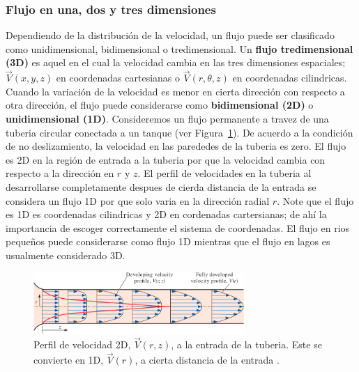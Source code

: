 \documentclass[10pt, oneside]{article}
\begin{document}
\subsubsection{Flujo en una, dos y tres dimensiones}
Dependiendo de la distribuci\'on de la velocidad, un flujo puede ser clasificado como unidimensional, bidimensional o tredimensional. Un \textbf{flujo tredimensional (3D)} es aquel en el cual la velocidad cambia en las tres dimensiones espaciales; $\vec{V}(x,y,z)$ en coordenadas cartesianas o $\vec{V}(r,\theta,z)$ en coordenadas cilindricas. Cuando la variaci\'on de la velocidad es menor en cierta direcci\'on con respecto a otra direcci\'on, el flujo puede considerarse como \textbf{bidimensional (2D)} o \textbf{unidimensional (1D)}.
Consideremos un flujo permanente a travez de una tuberia circular conectada a un tanque (ver Figura~\ref{flowd}). De acuerdo a la condici\'on de no deslizamiento, la velocidad en las parededes de la tuberia es zero. El flujo es 2D en la regi\'on de entrada a la tuberia por que la velocidad cambia con respecto a la direcci\'on en $r$ y $z$. El perfil de velocidades en la tuberia al desarrollarse completamente despues de cierda distancia de la entrada se considera un flujo 1D por que solo varia en la direcci\'on radial $r$. Note que el flujo es 1D es coordenadas cilindricas y 2D en cordenadas cartersianas; de ah\'i la importancia de escoger correctamente el sistema de coordenadas. El flujo en rios peque\~nos puede considerarse como flujo 1D mientras que el flujo en lagos es usualmente considerado 3D.

\begin{figure}[h]
\centering
\includegraphics[width=8cm]{flowd}
\caption{Perfil de velocidad 2D, $\vec{V}(r,z)$, a la entrada de la tuberia. Este se convierte en 1D, $\vec{V}(r)$, a  cierta distancia de la entrada \cite{this}.}
\label{flowd}
\end{figure}
\end{document}

